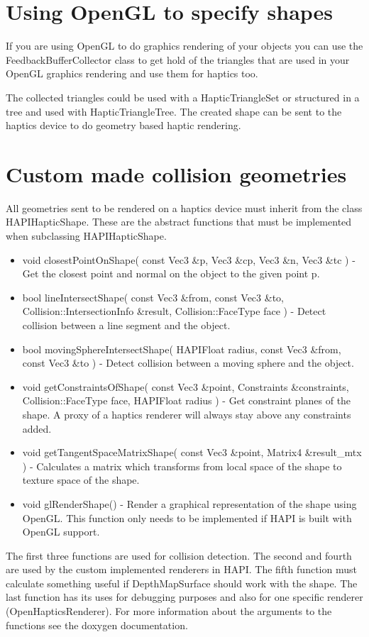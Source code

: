 \section{Using OpenGL to specify shapes}
If you are using OpenGL to do graphics rendering of your objects you
can use the FeedbackBufferCollector class to get hold of the triangles
that are used in your OpenGL graphics rendering and use them for
haptics too. 



The collected triangles could be used with a HapticTriangleSet or structured
in a tree and used with HapticTriangleTree. The created shape can be sent to
the haptics device to do geometry based haptic rendering.

\section{Custom made collision geometries}
All geometries sent to be rendered on a haptics device must
inherit from the class HAPIHapticShape. These are the abstract functions
that must be implemented when subclassing HAPIHapticShape.

\begin{itemize}
\item {\ttfamily void closestPointOnShape( const Vec3 \&p, Vec3 \&cp, Vec3 \&n, Vec3 \&tc )}
- Get the closest point and normal on the object to the given point p.
\item {\ttfamily bool lineIntersectShape( const Vec3 \&from, const Vec3 \&to, Collision::IntersectionInfo \&result, Collision::FaceType face )}
- Detect collision between a line segment and the object.
\item {\ttfamily bool movingSphereIntersectShape( HAPIFloat radius, const Vec3 \&from, const Vec3 \&to )}
- Detect collision between a moving sphere and the object.
\item {\ttfamily void getConstraintsOfShape( const Vec3 \&point, Constraints \&constraints, Collision::FaceType face, HAPIFloat radius )}
- Get constraint planes of the shape. A proxy of a haptics renderer will always stay above any constraints added.
\item {\ttfamily void getTangentSpaceMatrixShape( const Vec3 \&point, Matrix4 \&result\_mtx )}
- Calculates a matrix which transforms from local space of the shape to texture space of the shape.
\item {\ttfamily void glRenderShape() - Render a graphical representation of the shape}
using OpenGL. This function only needs to be implemented if HAPI is built with OpenGL support.
\end{itemize}

The first three functions are used for collision detection. The second and
fourth are used by the custom implemented renderers in HAPI. The fifth
function must calculate something useful if DepthMapSurface should work with
the shape. The last function has its uses for debugging purposes and also for
one specific renderer (OpenHapticsRenderer). For more information about the
arguments to the functions see the doxygen documentation.
